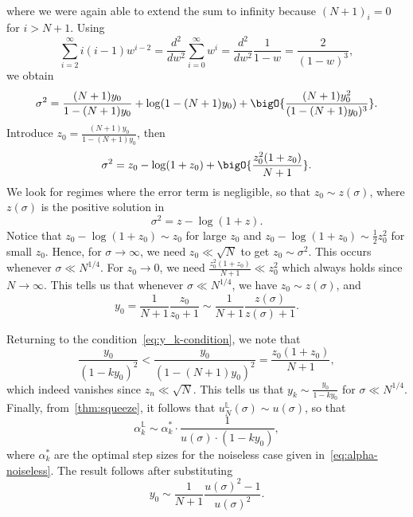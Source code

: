 \documentclass{article}
\begin{document}
\begin{appendixproof}
\begin{align*}
    \end{align*}
    where we were again able to extend the sum to infinity because $(N+1)_{i}=0$ for $i>N+1$. Using 
    \[
    \sum_{i=2}^\infty i(i-1)w^{i-2}=\frac{d^2}{dw^2}\sum_{i=0}^\infty w^i=\frac{d^2}{dw^2}\frac1{1-w}=\frac{2}{(1-w)^3},
    \]
    we obtain
    \[
    \sigma^2=\frac{(N+1)y_0}{1-(N+1)y_0}+\log(1-(N+1)y_0)+\bigO{\frac{(N+1)y_0^2}{(1-(N+1)y_0)^3}}.
    \]
    Introduce $z_0=\frac{(N+1)y_0}{1-(N+1)y_0}$, then
    \[
    \sigma^2=z_0-\log(1+z_0)+\bigO{\frac{z_0^2(1+z_0)}{N+1}}.
    \]
    We look for regimes where the error term is negligible, so that $z_0\sim z(\sigma)$, where $z(\sigma)$ is the positive solution in
    \begin{equation}\label{eq:z-implicit}
        \sigma^2=z-\log(1+z).
    \end{equation}
    Notice that $z_0-\log(1+z_0)\sim z_0$ for large $z_0$ and $z_0-\log(1+z_0)\sim \frac12z_0^2$ for small $z_0$. Hence, for $\sigma\to\infty$, we need $z_0\ll \sqrt{N}$ to get $z_0\sim \sigma^2$. This occurs whenever $\sigma\ll N^{1/4}$.
    For $z_0\to0$, we need $\frac{z_0^2(1+z_0)}{N+1}\ll z_0^2$ which always holds since $N\to\infty.$
    This tells us that whenever $\sigma\ll N^{1/4}$, we have $z_0\sim z(\sigma)$, and 
    \[y_0=\frac1{N+1}\frac{z_0}{z_0+1}\sim\frac1{N+1}\frac{z(\sigma)}{z(\sigma)+1}.\]

    Returning to the condition~\eqref{eq:y_k-condition}, we note that
    \[
    \frac{y_0}{(1-ky_0)^2}<\frac{y_0}{(1-(N+1)y_0)^2}=\frac{z_0(1+z_0)}{N+1},
    \]
    which indeed vanishes since $z_n\ll\sqrt{N}$. This tells us that $y_k\sim\frac{y_0}{1-ky_0}$ for $\sigma\ll N^{1/4}$.
    Finally, from~\cref{thm:squeeze}, it follows that $u_N^{\mathbb L}(\sigma)\sim u(\sigma)$, so that
    \[
    \alpha_k^{\mathbb L}\sim \alpha_k^*\cdot \frac{1}{u(\sigma)\cdot(1-ky_0)},
    \]
    where $\alpha_k^*$ are the optimal step sizes for the noiseless case given in~\eqref{eq:alpha-noiseless}. The result follows after substituting
    \[
    y_0\sim\frac1{N+1}\frac{u(\sigma)^2-1}{u(\sigma)^2}.
    \]
  \end{appendixproof}
\end{document}
